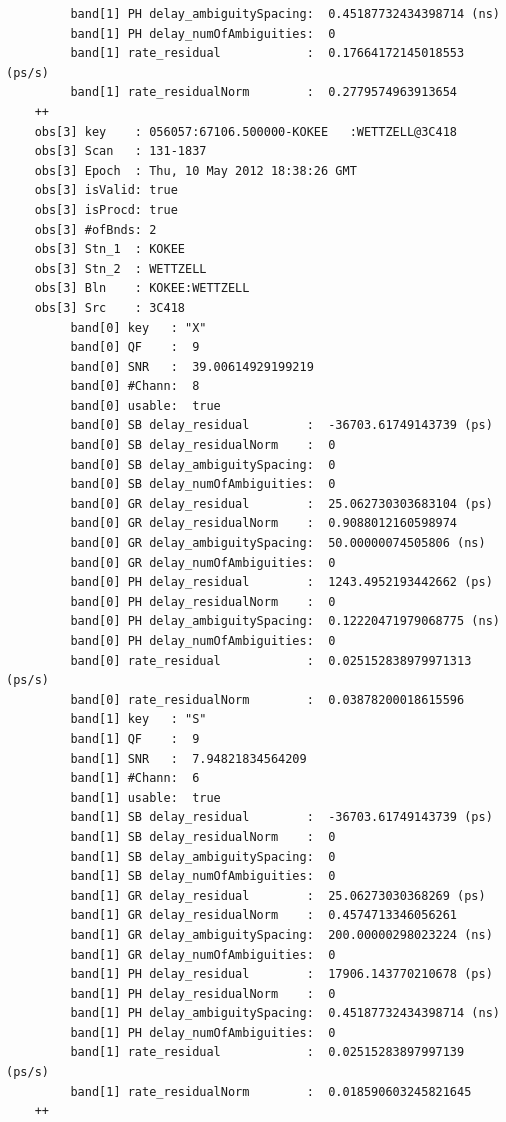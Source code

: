 \documentclass [10pt,letterpaper]{report}
\begin{document}
{{{\begin{verbatim}
         band[1] PH delay_ambiguitySpacing:  0.45187732434398714 (ns)
         band[1] PH delay_numOfAmbiguities:  0
         band[1] rate_residual            :  0.17664172145018553 (ps/s)
         band[1] rate_residualNorm        :  0.2779574963913654
    ++
    obs[3] key    : 056057:67106.500000-KOKEE   :WETTZELL@3C418   
    obs[3] Scan   : 131-1837  
    obs[3] Epoch  : Thu, 10 May 2012 18:38:26 GMT
    obs[3] isValid: true
    obs[3] isProcd: true
    obs[3] #ofBnds: 2
    obs[3] Stn_1  : KOKEE
    obs[3] Stn_2  : WETTZELL
    obs[3] Bln    : KOKEE:WETTZELL
    obs[3] Src    : 3C418
         band[0] key   : "X"
         band[0] QF    :  9
         band[0] SNR   :  39.00614929199219
         band[0] #Chann:  8
         band[0] usable:  true
         band[0] SB delay_residual        :  -36703.61749143739 (ps)
         band[0] SB delay_residualNorm    :  0
         band[0] SB delay_ambiguitySpacing:  0
         band[0] SB delay_numOfAmbiguities:  0
         band[0] GR delay_residual        :  25.062730303683104 (ps)
         band[0] GR delay_residualNorm    :  0.9088012160598974
         band[0] GR delay_ambiguitySpacing:  50.00000074505806 (ns)
         band[0] GR delay_numOfAmbiguities:  0
         band[0] PH delay_residual        :  1243.4952193442662 (ps)
         band[0] PH delay_residualNorm    :  0
         band[0] PH delay_ambiguitySpacing:  0.12220471979068775 (ns)
         band[0] PH delay_numOfAmbiguities:  0
         band[0] rate_residual            :  0.025152838979971313 (ps/s)
         band[0] rate_residualNorm        :  0.03878200018615596
         band[1] key   : "S"
         band[1] QF    :  9
         band[1] SNR   :  7.94821834564209
         band[1] #Chann:  6
         band[1] usable:  true
         band[1] SB delay_residual        :  -36703.61749143739 (ps)
         band[1] SB delay_residualNorm    :  0
         band[1] SB delay_ambiguitySpacing:  0
         band[1] SB delay_numOfAmbiguities:  0
         band[1] GR delay_residual        :  25.06273030368269 (ps)
         band[1] GR delay_residualNorm    :  0.4574713346056261
         band[1] GR delay_ambiguitySpacing:  200.00000298023224 (ns)
         band[1] GR delay_numOfAmbiguities:  0
         band[1] PH delay_residual        :  17906.143770210678 (ps)
         band[1] PH delay_residualNorm    :  0
         band[1] PH delay_ambiguitySpacing:  0.45187732434398714 (ns)
         band[1] PH delay_numOfAmbiguities:  0
         band[1] rate_residual            :  0.02515283897997139 (ps/s)
         band[1] rate_residualNorm        :  0.018590603245821645
    ++
\end{verbatim}}






}}
\end{document}
